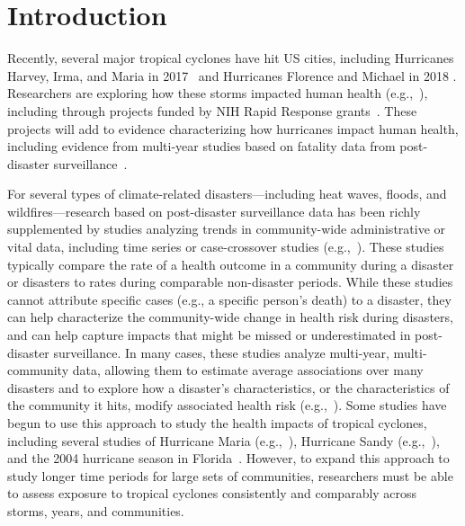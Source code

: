 \section*{Introduction}

\acresetall

Recently, several major tropical cyclones have hit \ac{US} cities, including
Hurricanes Harvey, Irma, and Maria in 2017~\parencite{blake20182017} and
Hurricanes Florence and Michael in 2018 \parencite{avila20192018}. Researchers
are exploring how these storms impacted human health
(e.g.,~\cite{santos2018use, rivera2018estimating, santos2018differential,
grineski2019impact, issa2018deaths, tanz2019notes, paul2019brief}), including
through projects funded by \ac{NIH} Rapid Response
grants~\parencite{nihreporter}. These projects will add to evidence
characterizing how hurricanes impact human health, including evidence from
multi-year studies based on fatality data from post-disaster
surveillance~\parencite{rappaport2000, rappaport2014fatalities,
rappaport2016fatalities, czajkowski2010fatal, czajkowski2011, moore2012}.

For several types of climate-related disasters---including heat waves, floods,
and wildfires---research based on post-disaster surveillance data has been
richly supplemented by studies analyzing trends in community-wide
administrative or vital data, including time series or case-crossover studies
(e.g.,~\cite{anderson2010heat, son2012impact, haikerwal2015impact,
liu2017wildfire, milojevic2017mental}).  These studies typically compare the
rate of a health outcome in a community during a disaster or disasters to rates
during comparable non-disaster periods.  While these studies cannot attribute
specific cases (e.g., a specific person's death) to a disaster, they can help
characterize the community-wide change in health risk during disasters, and can
help capture impacts that might be missed or underestimated in post-disaster
surveillance.  In many cases, these studies analyze multi-year, multi-community
data, allowing them to estimate average associations over many disasters and to
explore how a disaster's characteristics, or the characteristics of the
community it hits, modify associated health risk (e.g.,~\cite{anderson2010heat,
son2012impact, liu2017wildfire}).  Some studies have begun to use this approach
to study the health impacts of tropical cyclones, including several studies of
Hurricane Maria (e.g.,~\cite{santos2018use, santos2018differential}), Hurricane
Sandy (e.g.,~\cite{kim2016, mongin2017, swerdel2014}), and the 2004 hurricane
season in Florida~\parencite{mckinney2011}.  However, to expand this approach
to study longer time periods for large sets of communities, researchers must be
able to assess exposure to tropical cyclones consistently and comparably across
storms, years, and communities.  

